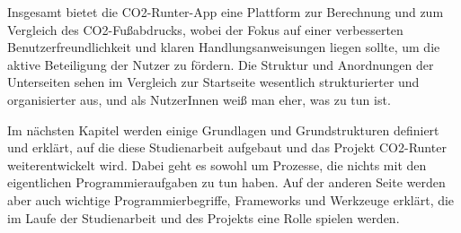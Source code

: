 Insgesamt bietet die CO2-Runter-App eine Plattform zur Berechnung und zum Vergleich des CO2-Fußabdrucks, wobei der Fokus auf einer verbesserten Benutzerfreundlichkeit und klaren Handlungsanweisungen liegen sollte, um die aktive Beteiligung der Nutzer zu fördern.
Die Struktur und Anordnungen der Unterseiten sehen im Vergleich zur Startseite wesentlich strukturierter und organisierter aus, und als NutzerInnen weiß man eher, was zu tun ist.


Im nächsten Kapitel werden einige Grundlagen und Grundstrukturen definiert und erklärt, auf die diese Studienarbeit aufgebaut und das Projekt CO2-Runter weiterentwickelt wird.
Dabei geht es sowohl um Prozesse, die nichts mit den eigentlichen Programmieraufgaben zu tun haben.
Auf der anderen Seite werden aber auch wichtige Programmierbegriffe, Frameworks und Werkzeuge erklärt, die im Laufe der Studienarbeit und des Projekts eine Rolle spielen werden.
